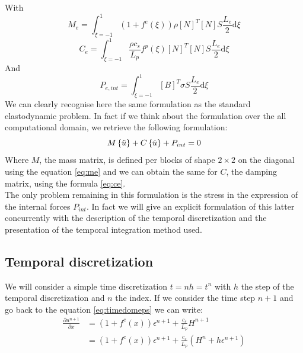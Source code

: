 With 
\begin{equation}
M_e = \int^1_{\xi=-1}(1+f^e(\xi))\rho \left[ N\right]^T \left[ N\right] S \frac{L_e}{2} \mathrm{d} \xi
\label{eq:me}
\end{equation}
\begin{equation}
C_e = \int^1_{\xi=-1}\frac{\rho c_s}{L_p}f^p(\xi) \left[ N\right]^T \left[ N\right] S \frac{L_e}{2} \mathrm{d} \xi
\label{eq:ce}
\end{equation}
And 
\begin{equation}
    P_{e,int} = \int^1_{\xi=-1} \left[B \right]^T \sigma S \frac{L_e}{2}\mathrm{d} \xi
    \label{eq:contP}
\end{equation}
We can clearly recognise here the same formulation as the standard elastodynamic problem. In fact if we think about the formulation over the all computational domain, we retrieve the following formulation:
\begin{equation}
    M\left\{\Ddot{u}\right\} + C\left\{\Dot{u}\right\} + P_{int} = 0
\end{equation}
Where $M$, the mass matrix, is defined per blocks of shape $2 \times 2$ on the diagonal using the equation \ref{eq:me} and we can obtain the same for $C$, the damping matrix, using the formula \ref{eq:ce}. \\
The only problem remaining in this formulation is the stress in the expression of the internal forces $P_{int}$. In fact we will give an explicit formulation of this latter
concurrently with the description of the temporal discretization and the presentation of the temporal integration method used.
\subsection{Temporal discretization}
We will consider a simple time discretization $t = n h = t^n $ with $h$ the step of the temporal discretization and $n$ the index. If we consider the time step $n+1$ and go back to the equation \ref{eq:timedomeps} we can write:
\begin{equation}
    \begin{aligned}
    \frac{\partial u^{n+1}}{\partial x} &= (1+f^e(x))\epsilon^{n+1} + \frac{c_s}{L_p}H^{n+1} \\
        &= (1+f^e(x))\epsilon^{n+1} + \frac{c_s}{L_p}\left(H^{n}+h \epsilon^{n+1}\right)        
    \end{aligned}
    \label{eq:eps_tn}
\end{equation}


